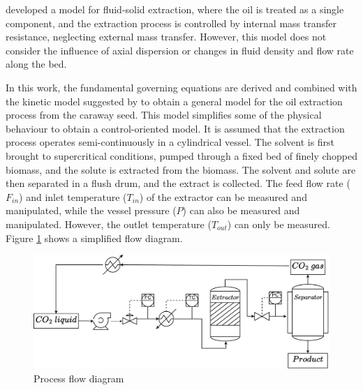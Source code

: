 \documentclass[../Article_Design_of_Experiment.tex]{subfiles}
\begin{document}
	\citet{Reverchon1996} developed a model for fluid-solid extraction, where the oil is treated as a single component, and the extraction process is controlled by internal mass transfer resistance, neglecting external mass transfer. However, this model does not consider the influence of axial dispersion or changes in fluid density and flow rate along the bed.
	
	In this work, the fundamental governing equations are derived and combined with the kinetic model suggested by \citet{Reverchon1996} to obtain a general model for the oil extraction process from the caraway seed. This model simplifies some of the physical behaviour to obtain a control-oriented model. It is assumed that the extraction process operates semi-continuously in a cylindrical vessel. The solvent is first brought to supercritical conditions, pumped through a fixed bed of finely chopped biomass, and the solute is extracted from the biomass. The solvent and solute are then separated in a flush drum, and the extract is collected. The feed flow rate ($F_{in}$) and inlet temperature ($T_{in}$) of the extractor can be measured and manipulated, while the vessel pressure ($P$) can also be measured and manipulated. However, the outlet temperature ($T_{out}$) can only be measured. Figure \ref{fig: SFE_drawing} shows a simplified flow diagram.
	
	\begin{figure}[h!]
		\centering
		\includegraphics[width=\columnwidth]{Figures/PFD.drawio.pdf}
		\caption{Process flow diagram}
		\label{fig: SFE_drawing}
	\end{figure}
		
\end{document}
